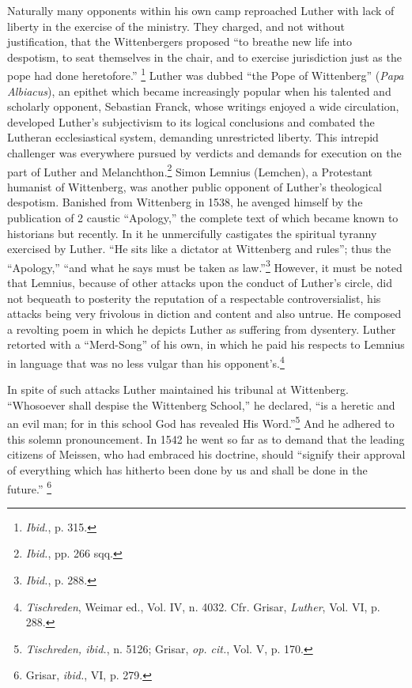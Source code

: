 Naturally many opponents within his own camp reproached Luther
with lack of liberty in the exercise of the ministry. They charged,
and not without justification, that the Wittenbergers proposed “to
breathe new life into despotism, to seat themselves in the chair, and
to exercise jurisdiction just as the pope had done heretofore.”
\footnote{\textit{Ibid.}, p. 315.}
Luther was dubbed “the Pope of Wittenberg” (\textit{Papa Albiacus}), an
epithet which became increasingly popular when his talented and
scholarly opponent, Sebastian Franck, whose writings enjoyed a wide
circulation, developed Luther’s subjectivism to its logical conclusions
and combated the Lutheran ecclesiastical system, demanding unrestricted
liberty. This intrepid challenger was everywhere pursued by
verdicts and demands for execution on the part of Luther and
Melanchthon.\footnote{\textit{Ibid.}, pp. 266 sqq.}
Simon Lemnius (Lemchen), a Protestant humanist of
Wittenberg, was another public opponent of Luther’s theological
despotism. Banished from Wittenberg in 1538, he avenged himself by
the publication of 2 caustic “Apology,” the complete text of which
became known to historians but recently. In it he unmercifully
castigates the spiritual tyranny exercised by Luther. “He sits like a
dictator at Wittenberg and rules”; thus the “Apology,” “and what
he says must be taken as law.”\footnote{\textit{Ibid.}, p. 288.}
However, it must be noted that
Lemnius, because of other attacks upon the conduct of Luther’s circle,
did not bequeath to posterity the reputation of a respectable
controversialist, his attacks being very frivolous
in diction and content and also untrue. He composed a revolting poem in which he
depicts Luther as suffering from dysentery. Luther retorted with a
“Merd-Song” of his own, in which he paid his respects to Lemnius in
language that was no less vulgar than his opponent’s.\footnote
{\textit{Tischreden}, Weimar ed., Vol. IV, n. 4032. Cfr. Grisar, \textit{Luther}, Vol. VI, p. 288.}

In spite of such attacks Luther maintained his tribunal at Wittenberg.
“Whosoever shall despise the Wittenberg School,” he declared,
“is a heretic and an evil man; for in this school God has revealed His
Word.”\footnote{\textit{Tischreden, ibid.}, n. 5126; Grisar, \textit{op. cit.}, Vol. V, p. 170.}
And he adhered to this solemn pronouncement. In 1542 he
went so far as to demand that the leading citizens of Meissen, who
had embraced his doctrine, should “signify their approval of everything
which has hitherto been done by us and shall be done in the
future.”
\footnote{Grisar, \textit{ibid.}, VI, p. 279.}

